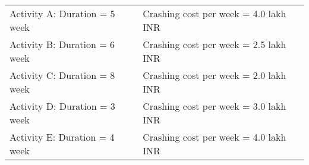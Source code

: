 \begin{center}
  \label{tab:activities}
  \begin{tabular}{@{}l l@{}}
    Activity A: Duration = 5 week  & Crashing cost per week = 4.0 lakh INR \\
    Activity B: Duration = 6 week  & Crashing cost per week = 2.5 lakh INR \\
    Activity C: Duration = 8 week  & Crashing cost per week = 2.0 lakh INR \\
    Activity D: Duration = 3 week  & Crashing cost per week = 3.0 lakh INR \\
    Activity E: Duration = 4 week  & Crashing cost per week = 4.0 lakh INR \\
  \end{tabular}
\end{center}
